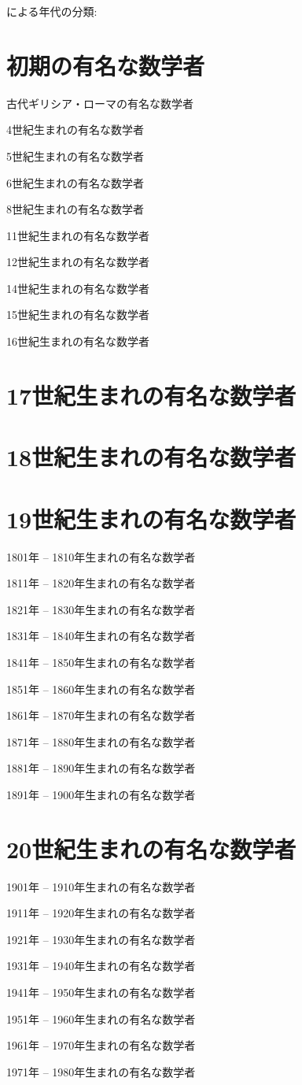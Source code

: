 \documentclass[a4paper,12pt]{jsarticle}
\theoremstyle{plain}
\theoremstyle{remark}  %
\theoremstyle{definition}  %
\begin{document}
\cite{wiki:数学者の一覧}による年代の分類:
\section{初期の有名な数学者}
古代ギリシア・ローマの有名な数学者

4世紀生まれの有名な数学者

5世紀生まれの有名な数学者

6世紀生まれの有名な数学者

8世紀生まれの有名な数学者

11世紀生まれの有名な数学者

12世紀生まれの有名な数学者

14世紀生まれの有名な数学者

15世紀生まれの有名な数学者

16世紀生まれの有名な数学者

\section{17世紀生まれの有名な数学者}

\section{18世紀生まれの有名な数学者}

\section{19世紀生まれの有名な数学者}
1801年 -- 1810年生まれの有名な数学者

1811年 -- 1820年生まれの有名な数学者

1821年 -- 1830年生まれの有名な数学者

1831年 -- 1840年生まれの有名な数学者

1841年 -- 1850年生まれの有名な数学者

1851年 -- 1860年生まれの有名な数学者

1861年 -- 1870年生まれの有名な数学者

1871年 -- 1880年生まれの有名な数学者

1881年 -- 1890年生まれの有名な数学者

1891年 -- 1900年生まれの有名な数学者

\section{20世紀生まれの有名な数学者}
1901年 -- 1910年生まれの有名な数学者

1911年 -- 1920年生まれの有名な数学者

1921年 -- 1930年生まれの有名な数学者

1931年 -- 1940年生まれの有名な数学者

1941年 -- 1950年生まれの有名な数学者

1951年 -- 1960年生まれの有名な数学者

1961年 -- 1970年生まれの有名な数学者

1971年 -- 1980年生まれの有名な数学者




\end{document}
